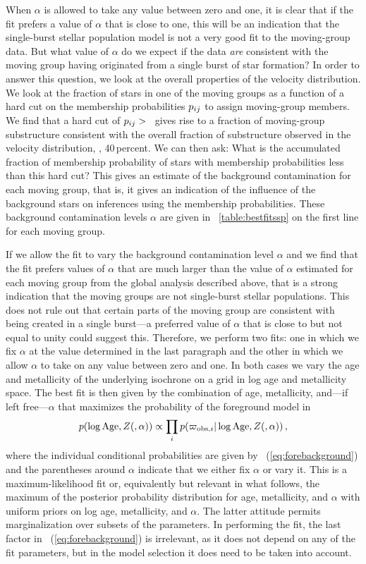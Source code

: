 When $\alpha$ is allowed to take any value between zero and one, it is
clear that if the fit prefers a value of $\alpha$ that is close to
one, this will be an indication that the single-burst stellar
population model is not a very good fit to the moving-group data. But
what value of $\alpha$ do we expect if the data \emph{are} consistent
with the moving group having originated from a single burst of star
formation? In order to answer this question, we look at the overall
properties of the velocity distribution. We look at the fraction of
stars in one of the moving groups as a function of a hard cut on the
membership probabilities $p_{ij}$ to assign moving-group members. We
find that a hard cut of $p_{ij} > $ \lsrpijcut\ gives rise to a fraction
of moving-group substructure consistent with the overall fraction of
substructure observed in the velocity distribution, \ie,
40\,percent. We can then ask: What is the accumulated fraction of
membership probability of stars with membership probabilities less
than this hard cut? This gives an estimate of the background
contamination for each moving group, that is, it gives an indication
of the influence of the background stars on inferences using the
membership probabilities. These background contamination levels
$\alpha$ are given in \tablename~\ref{table:bestfitssp} on the first
line for each moving group.

If we allow the fit to vary the background contamination level
$\alpha$ and we find that the fit prefers values of $\alpha$ that are
much larger than the value of $\alpha$ estimated for each moving group
from the global analysis described above, that is a strong indication
that the moving groups are not single-burst stellar populations. This
does not rule out that certain parts of the moving group are
consistent with being created in a single burst---a preferred value of
$\alpha$ that is close to but not equal to unity could suggest
this. Therefore, we perform two fits: one in which we fix $\alpha$ at
the value determined in the last paragraph and the other in which we
allow $\alpha$ to take on any value between zero and one. In both
cases we vary the age and metallicity of the underlying isochrone on a
grid in log age and metallicity space. The best fit is then given by
the combination of age, metallicity, and---if left free---$\alpha$
that maximizes the probability of the foreground model in
\begin{equation}\label{eq:maxlikeSSP}
p(\log \mathrm{Age},Z(, \alpha)) \propto \prod_i p(\varpi_{\mathrm{obs},i} | \log \mathrm{Age}, Z(, \alpha))\,,
\end{equation}
where the individual conditional probabilities are given by
\eqnname~(\ref{eq:forebackground}) and the parentheses around $\alpha$
indicate that we either fix $\alpha$ or vary it. This is a
maximum-likelihood fit or, equivalently but relevant in what follows,
the maximum of the posterior probability distribution for age,
metallicity, and $\alpha$ with uniform priors on log age, metallicity,
and $\alpha$. The latter attitude permits marginalization over subsets
of the parameters. In performing the fit, the last factor in
\eqnname~(\ref{eq:forebackground}) is irrelevant, as it does not
depend on any of the fit parameters, but in the model selection it
does need to be taken into account.

